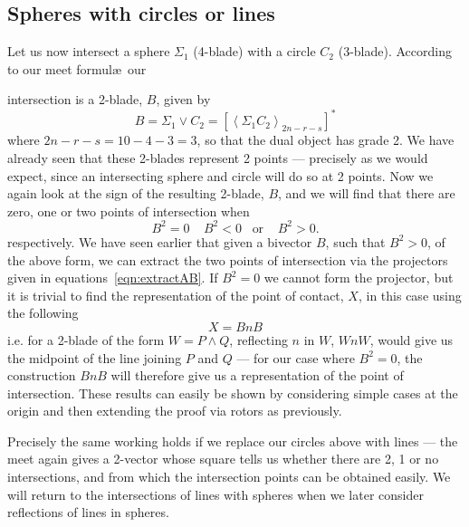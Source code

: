 
\subsection{Spheres with circles or lines}

Let us now intersect a sphere $\Sigma_1$ (4-blade) with a
circle $C_2$ (3-blade). According to our meet formul\ae\ our

intersection is a 2-blade, $B$, given by
%
\begin{equation}
B = \Sigma_1 \vee C_2 = \left[\left< \Sigma_1 C_2
\right>_{2n-r-s}\right]^*
\end{equation}
%
where $2n-r-s=10-4-3=3$, so that the dual object has
grade 2. We have already seen that these 2-blades
represent 2 points --- precisely as we would expect, since
an intersecting sphere and circle will do so at 2 points.
Now we again look at the sign of the resulting 2-blade,
$B$, and we will find that there are zero, one or two
points of intersection when
%
\[  B^2=0 \;\;\;\; B^2<0 \;\;\;\mbox{or}\;\;\;\; B^2>0.
\]
%
respectively.
We have seen earlier that given a bivector $B$, such that
$B^2>0$, of the above form, we can extract the two points
of intersection via the projectors given in
equations~\ref{eqn:extractAB}. If $B^2=0$ we cannot form
the projector, but it is trivial to find the representation of the point of
contact, $X$, in this case using the following
%
\[  X = BnB  \]
%
i.e. for a 2-blade of the form $W = P\wedge Q$, reflecting
$n$ in $W$, $WnW$, would give us the midpoint of the line
joining $P$ and $Q$ --- for our case where $B^2=0$, the
construction $BnB$ will therefore give us a representation of the point of
intersection. These results can easily be shown by
considering simple cases at the origin and then extending
the proof via rotors as previously.

Precisely the same working holds if we replace our
circles above with lines --- the meet again gives a
2-vector whose square tells us whether there are 2, 1 or
no intersections, and from which the intersection points
can be obtained easily. We will return to the
intersections of lines with spheres when we later
consider reflections of lines in spheres.





